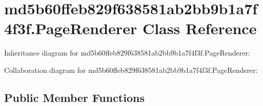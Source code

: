 \hypertarget{classmd5b60ffeb829f638581ab2bb9b1a7f4f3f_1_1_page_renderer}{}\section{md5b60ffeb829f638581ab2bb9b1a7f4f3f.\+Page\+Renderer Class Reference}
\label{classmd5b60ffeb829f638581ab2bb9b1a7f4f3f_1_1_page_renderer}


Inheritance diagram for md5b60ffeb829f638581ab2bb9b1a7f4f3f.\+Page\+Renderer\+:


Collaboration diagram for md5b60ffeb829f638581ab2bb9b1a7f4f3f.\+Page\+Renderer\+:
\subsection*{Public Member Functions}

